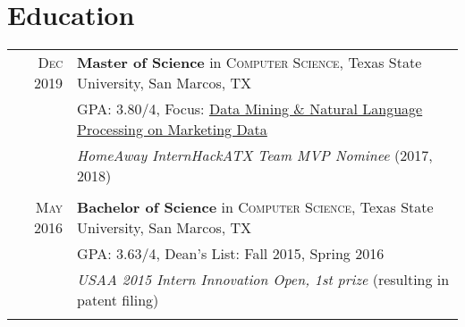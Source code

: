 \documentclass[a4paper,10pt]{article}
\begin{document}
\section{Education}
\begin{tabular}{rl}	
	\textsc{Dec} 2019 & \textbf{Master of Science} in \textsc{Computer Science}, Texas State University, San Marcos, TX\\
	
	&\normalsize \textsc{GPA}: 3.80/4, Focus: \underline{Data Mining \& Natural Language Processing on Marketing Data} \\ 
	
	& \emph{HomeAway InternHackATX Team MVP Nominee} (2017, 2018) \\
	
	& \\
	
	\textsc{May} 2016 & \textbf{Bachelor of Science} in \textsc{Computer Science}, Texas State University, San Marcos, TX \\
	
	&\normalsize \textsc{GPA}: 3.63/4,  Dean's List: Fall 2015, Spring 2016 \\
	
	& \emph{USAA 2015 Intern Innovation Open, 1st prize} (resulting in patent filing)  \\
	
	& \\
\end{tabular}

\end{document}
